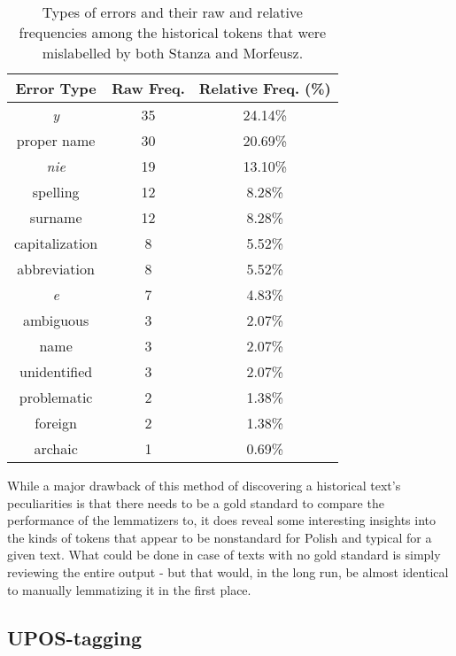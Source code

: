 \renewcommand{\arraystretch}{1.25}
\begin{table}[h]
\begin{center}
\begin{tabular}{|c|cc|}
\hline \bf Error Type & \bf Raw Freq. & \bf Relative Freq. (\%) \\ \hline
\textit{y} & 35 & 24.14\%  \\
proper name & 30 & 20.69\%  \\
\textit{nie} & 19 & 13.10\%  \\
spelling & 12 & 8.28\% \\ 
surname & 12 & 8.28\% \\
capitalization & 8 & 5.52\% \\
abbreviation & 8 & 5.52\% \\
\textit{e} & 7 & 4.83\% \\
ambiguous & 3 & 2.07\% \\
name & 3 & 2.07\% \\
unidentified & 3 & 2.07\% \\
problematic & 2 & 1.38\% \\
foreign & 2 & 1.38\% \\
archaic & 1 & 0.69\% \\
\hline
\end{tabular}
\caption{\label{table:lemmas-errors} Types of errors and their raw and relative frequencies among the historical tokens that were mislabelled by both Stanza and Morfeusz.}
\end{center}
\end{table}

While a major drawback of this method of discovering a historical text's peculiarities is that there needs to be a gold standard to compare the performance of the lemmatizers to, it does reveal some interesting insights into the kinds of tokens that appear to be nonstandard for Polish and typical for a given text. What could be done in case of texts with no gold standard is simply reviewing the entire output - but that would, in the long run, be almost identical to manually lemmatizing it in the first place.

\subsection{UPOS-tagging}
\label{subsec:upos-tagging}

